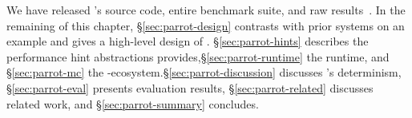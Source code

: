 We have released \parrot's source code, entire benchmark suite, and
raw results~\cite{Parrot:github}. In the remaining of this chapter,
\S\ref{sec:parrot-design} contrasts \parrot with 
prior systems on an example and gives a high-level design of
\parrot. \S\ref{sec:parrot-hints} describes the performance hint abstractions
\parrot provides,\S\ref{sec:parrot-runtime} the \parrot runtime,
and \S\ref{sec:parrot-mc} the
\parrot-\dbug ecosystem.\S\ref{sec:parrot-discussion} discusses \parrot's
determinism, \S\ref{sec:parrot-eval}
presents evaluation results, \S\ref{sec:parrot-related}
discusses related work, and \S\ref{sec:parrot-summary} concludes.
